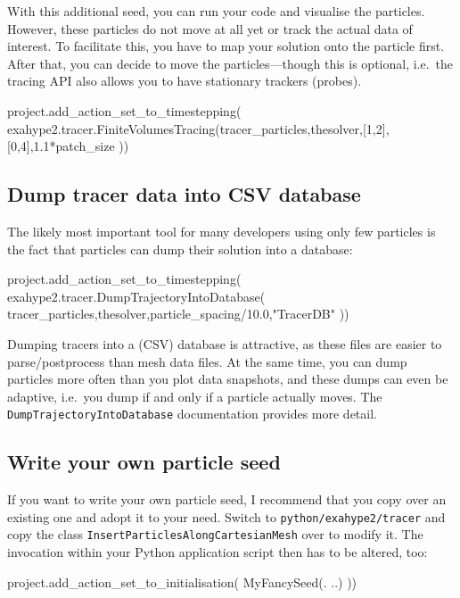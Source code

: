\noindent
With this additional seed, you can run your code and visualise the particles. 
However, these particles do not move at all yet or track the actual data of
interest.
To facilitate this, you have to map your solution onto the particle first.
After that, you can decide to move the particles---though this is optional,
i.e.~the tracing API also allows you to have stationary trackers (probes).


\begin{code}
project.add_action_set_to_timestepping(
 exahype2.tracer.FiniteVolumesTracing(tracer_particles,thesolver,[1,2],[0,4],1.1*patch_size
))
\end{code}


\subsection{Dump tracer data into CSV database}

The likely most important tool for many developers using only few particles is
the fact that particles can dump their solution into a database:

\begin{code}
project.add_action_set_to_timestepping( 
 exahype2.tracer.DumpTrajectoryIntoDatabase(
  tracer_particles,thesolver,particle_spacing/10.0,"TracerDB"
))
\end{code}

\noindent
Dumping tracers into a (CSV) database is attractive, as these files are easier
to parse/postprocess than mesh data files. 
At the same time, you can dump particles more often than you plot data
snapshots, and these dumps can even be adaptive, i.e.~you dump if and only if a
particle actually moves.
The \texttt{DumpTrajectoryIntoDatabase} documentation provides more detail.


\subsection{Write your own particle seed}

If you want to write your own particle seed, I recommend that you copy over an
existing one and adopt it to your need.
Switch to \texttt{python/exahype2/tracer} and copy the class
\texttt{InsertParticlesAlongCartesianMesh} over to modify it.
The invocation within your Python application script then has to be altered,
too:

\begin{code}
project.add_action_set_to_initialisation( MyFancySeed(. ..) ))
\end{code}


